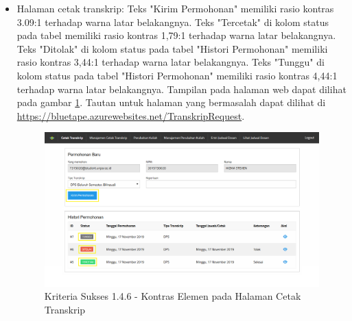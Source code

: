 \documentclass[a4paper,twoside]{article}
\begin{document}
\begin{enumerate}
\begin{itemize}
			\item Halaman cetak transkrip: Teks "Kirim Permohonan" memiliki rasio kontras 3.09:1 terhadap warna latar belakangnya. Teks "Tercetak" di kolom status pada tabel memiliki rasio kontras 1,79:1 terhadap warna latar belakangnya. Teks "Ditolak" di kolom status pada tabel "Histori Permohonan" memiliki rasio kontras 3,44:1 terhadap warna latar belakangnya. Teks "Tunggu" di kolom status pada tabel "Histori Permohonan" memiliki rasio kontras 4,44:1 terhadap warna latar belakangnya. Tampilan pada halaman web dapat dilihat pada gambar \ref{fig:1.4.6_contrast_enchanced_2}. Tautan untuk halaman yang bermasalah dapat dilihat di \url{https://bluetape.azurewebsites.net/TranskripRequest}.
			\begin{figure}[H]
				\centering  
				\includegraphics[scale=0.3, frame]{kriteria-sukses-1-4-6-contrast-enchanced-2}  
				\caption[Kriteria Sukses 1.4.6 - Kontras Elemen pada Halaman Cetak Transkrip]{Kriteria Sukses 1.4.6 - Kontras Elemen pada Halaman Cetak Transkrip}
				\label{fig:1.4.6_contrast_enchanced_2}  
			\end{figure} 
			

\end{itemize}
\end{enumerate}
\end{document}
